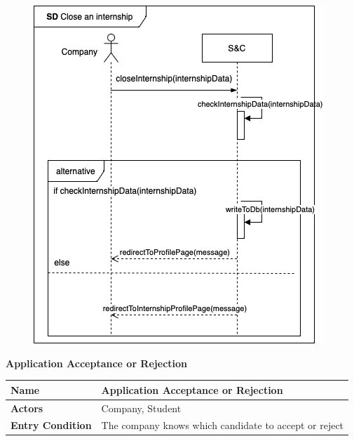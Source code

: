 \begin{enumerate}[label=\textbf{[US\arabic*]}, left = 0pt, align = left, resume]
\begin{longtable}{|l|p{11cm}|}
            \end{longtable}

\newpage
            \begin{figure}[h!]
                \centering        \includegraphics{RASD/Images/UseCases/CloseInternship.drawio.png}
                \label{fig:example}
                \end{figure}
\newpage

            \newpage
            \item \textbf{Application Acceptance or Rejection}
            
            \begin{longtable}{|l|p{11cm}|}  
                \hline
                \textbf{Name} & 
                    \textbf{Application Acceptance or Rejection} \\
                \hline
                
                \textbf{Actors} & 
                    Company, Student \\
                \hline
                
                \textbf{Entry Condition} & 
                    The company knows which candidate to accept or reject \\
                \hline
                

\end{longtable}
\end{enumerate}
